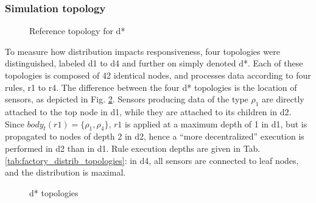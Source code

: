\documentclass{iosart2c}
\begin{document}
\subsubsection{Simulation topology}

\begin{figure}
	\centering
	\caption{Reference topology for d*}
	\label{fig:factory_distrib_topologies}
	\scalebox{0.95}{
		
	}
\end{figure}

\begin{table}
	\centering
	\caption{Machines hosts for distribution experiments}
	\label{tab:distrib_hosts}
\end{table}

To measure how distribution impacts responsiveness, four topologies were distinguished, labeled d1 to d4 and further on simply denoted d*. Each of these topologies is composed of 42 identical nodes, and processes data according to four rules, r1 to r4.
The difference between the four d* topologies is the location of sensors, as depicted in Fig. \ref{fig:dstar}. 
Sensors producing data of the type $\rho_{1}$ are directly attached to the top node in d1, while they are attached to its children in d2. 
Since $body_t(r1)=\{\rho_{1}, \rho_{4}\}$, $r1$ is applied at a maximum depth of 1 in d1, but is propagated to nodes of depth 2 in d2, hence a ``more decentralized'' execution is performed in d2 than in d1.
Rule execution depths are given in Tab. \ref{tab:factory_distrib_topologies}: in d4, all sensors are connected to leaf nodes, and the distribution is maximal.

\begin{figure}
	\centering
	\caption{d* topologies}
	\label{fig:dstar}
	\scalebox{0.75}{
		
	}
	
	\centering
	\scalebox{0.75}{
		
	}
	
%	
\end{figure}
\end{document}

